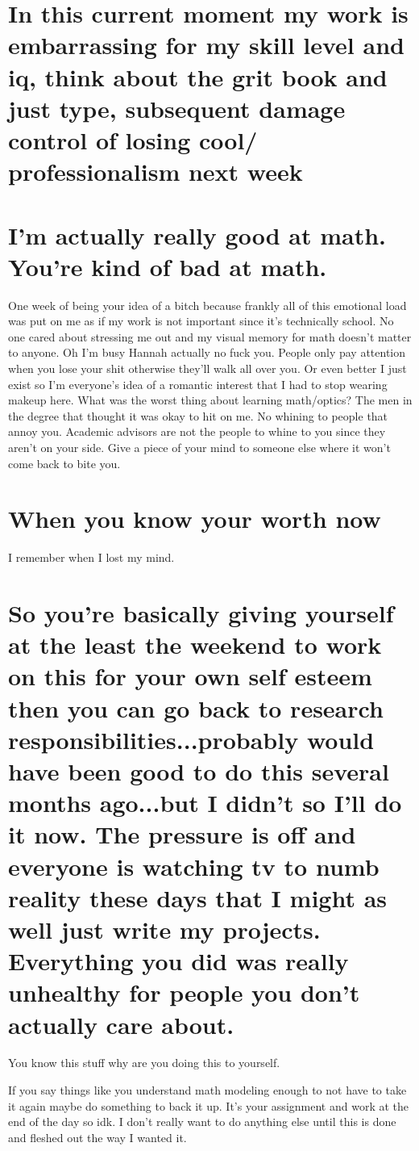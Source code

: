\section{In this current moment my work is embarrassing for my skill level and iq, think about the grit book and just type, subsequent damage control of losing cool/ professionalism next week}

\section{I'm actually really good at math. You're kind of bad at math.}

One week of being your idea of a bitch because frankly all of this emotional load was put on me as if my work is not important since it's technically school. No one cared about stressing me out and my visual memory for math doesn't matter to anyone. Oh I'm busy Hannah actually no fuck you. People only pay attention when you lose your shit otherwise they'll walk all over you. Or even better I just exist so I'm everyone's idea of a romantic interest that I had to stop wearing makeup here. What was the worst thing about learning math/optics? The men in the degree that thought it was okay to hit on me. No whining to people that annoy you. Academic advisors are not the people to whine to you since they aren't on your side. Give a piece of your mind to someone else where it won't come back to bite you.  

\section{When you know your worth now}
I remember when I lost my mind. 
\section{So you're basically giving yourself at the least the weekend to work on this for your own self esteem then you can go back to research responsibilities...probably would have been good to do this several months ago...but I didn't so I'll do it now. The pressure is off and everyone is watching tv to numb reality these days that I might as well just write my projects. Everything you did was really unhealthy for people you don't actually care about.}

You know this stuff why are you doing this to yourself. 

If you say things like you understand math modeling enough to not have to take it again maybe do something to back it up. It's your assignment and work at the end of the day so idk. I don't really want to do anything else until this is done and fleshed out the way I wanted it. 

